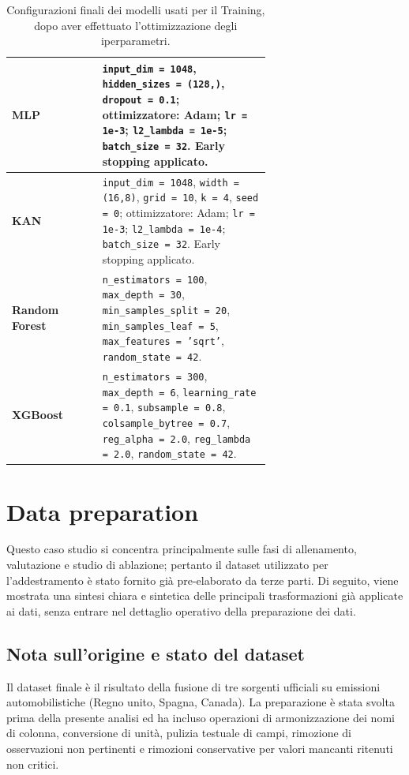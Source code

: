 \documentclass[a4paper,12pt]{report}
\begin{document}
	\begin{table}[H]
		\centering
		\caption{Configurazioni finali dei modelli usati per il Training, dopo aver effettuato l'ottimizzazione degli iperparametri.}
		\label{tab:model-config}
		\begin{tabular}{l p{0.65\linewidth}}
			\toprule
			\textbf{MLP} & \texttt{input\_dim = 1048}, \texttt{hidden\_sizes = (128,)}, \texttt{dropout = 0.1}; ottimizzatore: Adam; \texttt{lr = 1e-3}; \texttt{l2\_lambda = 1e-5}; \texttt{batch\_size = 32}. Early stopping applicato. \\
			\midrule
			\textbf{KAN} & \texttt{input\_dim = 1048}, \texttt{width = (16,8)}, \texttt{grid = 10}, \texttt{k = 4}, \texttt{seed = 0}; ottimizzatore: Adam; \texttt{lr = 1e-3}; \texttt{l2\_lambda = 1e-4}; \texttt{batch\_size = 32}. Early stopping applicato. \\
			\midrule
			\textbf{Random Forest} & \texttt{n\_estimators = 100}, \texttt{max\_depth = 30}, \texttt{min\_samples\_split = 20}, \texttt{min\_samples\_leaf = 5}, \texttt{max\_features = 'sqrt'}, \texttt{random\_state = 42}. \\
			\midrule
			\textbf{XGBoost} & \texttt{n\_estimators = 300}, \texttt{max\_depth = 6}, \texttt{learning\_rate = 0.1}, \texttt{subsample = 0.8}, \texttt{colsample\_bytree = 0.7}, \texttt{reg\_alpha = 2.0}, \texttt{reg\_lambda = 2.0}, \texttt{random\_state = 42}. \\
			\bottomrule
		\end{tabular}
	\end{table}
	
	\section{Data preparation}
	
	Questo caso studio si concentra principalmente sulle fasi di allenamento, valutazione e studio di ablazione; pertanto il dataset utilizzato per l'addestramento è stato fornito già pre-elaborato da terze parti. Di seguito, viene mostrata una sintesi chiara e sintetica delle principali trasformazioni già applicate ai dati, senza entrare nel dettaglio operativo della preparazione dei dati.
	
	\subsection{Nota sull'origine e stato del dataset}
	Il dataset finale è il risultato della fusione di tre sorgenti ufficiali su emissioni automobilistiche (Regno unito, Spagna, Canada). La preparazione è stata svolta prima della presente analisi ed ha incluso operazioni di armonizzazione dei nomi di colonna, conversione di unità, pulizia testuale di campi, rimozione di osservazioni non pertinenti e rimozioni conservative per valori mancanti ritenuti non critici.
	
\end{document}
